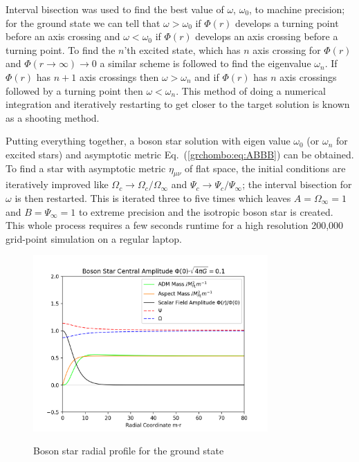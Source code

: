Interval bisection was used to find the best value of $\omega$, $\omega_0$, to machine precision; for the ground state we can tell that $\omega>\omega_0$ if $\Phi(r)$ develops a turning point before an axis crossing and $\omega < \omega_0$ if $\Phi(r)$ develops an axis crossing before a turning point. To find the $n$'th excited state, which has $n$ axis crossing for $\Phi(r)$ and $\Phi(r\rightarrow \infty) \rightarrow 0$ a similar scheme is followed to find the eigenvalue $\omega_n$. If $\Phi(r)$ has $n+1$ axis crossings then $\omega>\omega_n$ and if $\Phi(r)$ has $n$ axis crossings followed by a turning point then $\omega<\omega_n$. This method of doing a numerical integration and iteratively restarting to get closer to the target solution is known as a shooting method.

Putting everything together, a boson star solution with eigen value $\omega_0$ (or $\omega_n$ for excited stars) and asymptotic metric Eq.~(\ref{grchombo:eq:ABBB}) can be obtained. To find a star with asymptotic metric $\eta_{\mu\nu}$ of flat space, the initial conditions are iteratively improved like $\Omega_c \rightarrow \Omega_c / \Omega_\infty$ and $\Psi_c \rightarrow \Psi_c / \Psi_\infty$; the interval bisection for $\omega$ is then restarted. This is iterated three to five times which leaves $A=\Omega_\infty=1$ and $B=\Psi_\infty=1$ to extreme precision and the isotropic boson star is created. This whole process requires a few seconds runtime for a high resolution 200,000 grid-point simulation on a regular laptop.





  \begin{figure}[h!]
  \caption{Boson star radial profile for the ground state}
  \centering
  \includegraphics[width=0.8\textwidth]{png/bosonstar_groundstate.png}\label{boson:fig:f1}
\end{figure}

